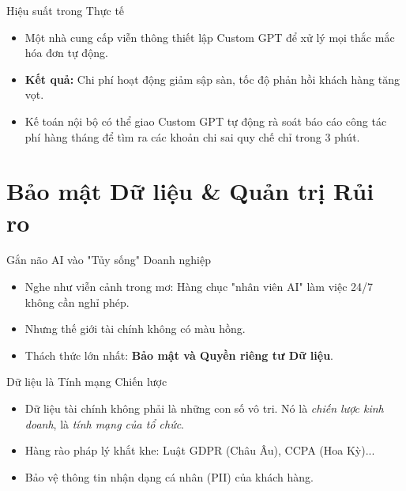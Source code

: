 \documentclass[aspectratio=169,12pt]{beamer}
\begin{document}
\begin{frame}{Hiệu suất trong Thực tế}
    \begin{itemize}
        \item Một nhà cung cấp viễn thông thiết lập Custom GPT để xử lý mọi thắc mắc hóa đơn tự động.
        \item \textbf{Kết quả:} Chi phí hoạt động giảm sập sàn, tốc độ phản hồi khách hàng tăng vọt.
        \item Kế toán nội bộ có thể giao Custom GPT tự động rà soát báo cáo công tác phí hàng tháng để tìm ra các khoản chi sai quy chế chỉ trong 3 phút.
    \end{itemize}
\end{frame}


\section{Bảo mật Dữ liệu \& Quản trị Rủi ro}
\begin{frame}
    \tableofcontents[currentsection]
\end{frame}

\begin{frame}{Gắn não AI vào "Tủy sống" Doanh nghiệp}
    \begin{itemize}
        \item Nghe như viễn cảnh trong mơ: Hàng chục "nhân viên AI" làm việc 24/7 không cần nghỉ phép.
        \item Nhưng thế giới tài chính không có màu hồng.
        \item Thách thức lớn nhất: \textbf{Bảo mật và Quyền riêng tư Dữ liệu}.
    \end{itemize}
\end{frame}

\begin{frame}{Dữ liệu là Tính mạng Chiến lược}
    \begin{itemize}
        \item Dữ liệu tài chính không phải là những con số vô tri. Nó là \textit{chiến lược kinh doanh}, là \textit{tính mạng của tổ chức}.
        \item Hàng rào pháp lý khắt khe: Luật GDPR (Châu Âu), CCPA (Hoa Kỳ)...
        \item Bảo vệ thông tin nhận dạng cá nhân (PII) của khách hàng.
    \end{itemize}
\end{frame}
\end{document}
